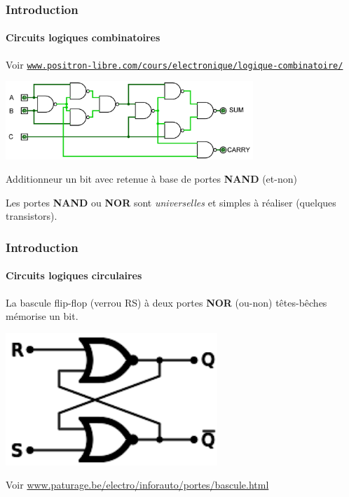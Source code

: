 \documentclass[xcolor=svgnames,final,smaller,a4]{beamer}
\begin{document}
\begin{frame}
  \frametitle{Introduction}
  \framesubtitle{Circuits logiques combinatoires}

Voir \href{https://www.positron-libre.com/cours/electronique/logique-combinatoire/}{\texttt{www.positron-libre.com/cours/electronique/logique-combinatoire/}}

\vspace{0.5cm}

 \includegraphics[width=0.7\textwidth]{Full-Adder-Nand}

 \vspace{0.5cm}

 Additionneur un bit avec retenue à base de portes \textbf{NAND} (et-non)
 
Les portes \textbf{NAND} ou \textbf{NOR} sont \textit{universelles} et simples à réaliser (quelques transistors).


\end{frame}


\begin{frame}
  \frametitle{Introduction}
  \framesubtitle{Circuits logiques circulaires}

La bascule flip-flop (verrou RS) à deux portes  \textbf{NOR} (ou-non) têtes-bêches mémorise un bit.

\vspace{0.5cm}


 \includegraphics[width=0.6\textwidth]{RS-Flip-flop}



\vspace{0.5cm}

Voir \href{http://www.paturage.be/electro/inforauto/portes/bascule.html}{www.paturage.be/electro/inforauto/portes/bascule.html}

\end{frame}
\end{document}
